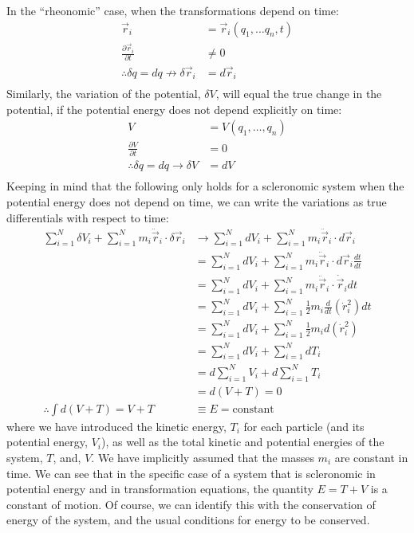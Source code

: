 In the ``rheonomic'' case, when the transformations depend on time:
\begin{align}
\vec{r}_i&=\vec{r}_i(q_1,\dots q_n,t)\nonumber\\
\frac{\partial \vec{r}_i}{\partial t}&\neq 0\nonumber\\
\therefore \delta q=dq\not\to  \delta \vec{r}_i&= d\vec{r}_i\nonumber\\
\end{align}
Similarly, the variation of the potential, $\delta V$, will equal the true change in the potential, if the potential energy does not depend explicitly on time:
\begin{align}
V&=V(q_1,\dots ,q_n)\nonumber\\
\frac{\partial V}{\partial t}&=0\nonumber\\
\therefore \delta q=dq\to  \delta V&=dV\nonumber\\
\end{align}
Keeping in mind that the following only holds for a scleronomic system when the potential energy does not depend on time, we can write the variations as true differentials with respect to time:
\begin{align}
\sum_{i=1}^N\delta V_i  +\sum_{i=1}^N m_i\ddot{\vec{r}}_i \cdot\delta\vec{r}_i&\to \sum_{i=1}^N dV_i +\sum_{i=1}^N m_i\ddot{\vec{r}}_i\cdot d\vec{r}_i\nonumber\\
&=\sum_{i=1}^N dV_i+\sum_{i=1}^N m_i\ddot{\vec{r}}_i\cdot d\vec{r}_i \frac{dt}{dt}\nonumber\\
&=\sum_{i=1}^N dV_i+\sum_{i=1}^N m_i\ddot{\vec{r}}_i\cdot \dot{\vec{r}}_i dt\nonumber\\
&=\sum_{i=1}^N dV_i+\sum_{i=1}^N \frac{1}{2}m_i\frac{d}{dt}(\dot{r}_i^2) dt\nonumber\\
&=\sum_{i=1}^N dV_i+\sum_{i=1}^N \frac{1}{2}m_i d(\dot{r}_i^2)\nonumber\\
&=\sum_{i=1}^N dV_i+\sum_{i=1}^N dT_i\nonumber\\
&=d\sum_{i=1}^N V_i+d\sum_{i=1}^N T_i\nonumber\\
&=d(V+T)=0\nonumber\\
\therefore \int d(V+T)=V+T &\equiv E = \text{constant}
\end{align}
where we have introduced the kinetic energy, $T_i$ for each particle (and its potential energy, $V_i$), as well as the total kinetic and potential energies of the system, $T$, and, $V$. We have implicitly assumed that the masses $m_i$ are constant in time. We can see that in the specific case of a system that is scleronomic in potential energy and in transformation equations, the quantity $E=T+V$ is a constant of motion. Of course, we can identify this with the conservation of energy of the system, and the usual conditions for energy to be conserved.

